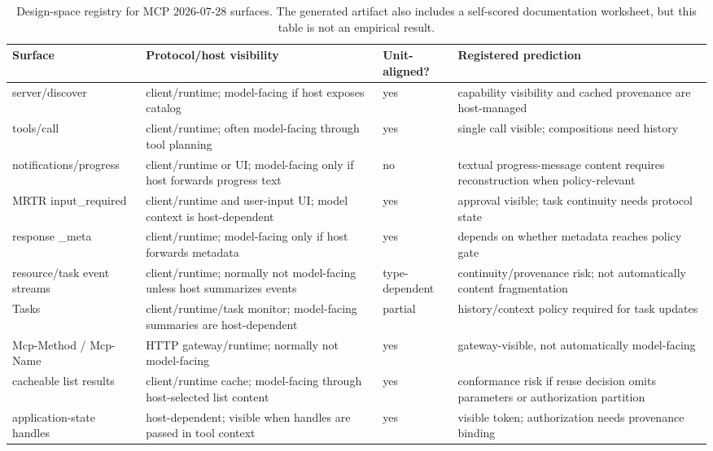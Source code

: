 \begin{table}[t]
  \caption{Design-space registry for MCP 2026-07-28 surfaces. The generated
  artifact also includes a self-scored documentation worksheet, but this table
  is not an empirical result.}
  \label{tab:predictions}
  \centering\footnotesize
  \begin{tabular}{@{}p{}p{}p{}p{}@{}}
    \toprule
    Surface & Protocol/host visibility & Unit-aligned? & Registered prediction \\
    \midrule
    server/discover & client/runtime; model-facing if host exposes catalog & yes & capability visibility and cached provenance are host-managed \\
    tools/call & client/runtime; often model-facing through tool planning & yes & single call visible; compositions need history \\
    notifications/progress & client/runtime or UI; model-facing only if host forwards progress text & no & textual progress-message content requires reconstruction when policy-relevant \\
    MRTR input\_required & client/runtime and user-input UI; model context is host-dependent & yes & approval visible; task continuity needs protocol state \\
    response \_meta & client/runtime; model-facing only if host forwards metadata & yes & depends on whether metadata reaches policy gate \\
    resource/task event streams & client/runtime; normally not model-facing unless host summarizes events & type-dependent & continuity/provenance risk; not automatically content fragmentation \\
    Tasks & client/runtime/task monitor; model-facing summaries are host-dependent & partial & history/context policy required for task updates \\
    Mcp-Method / Mcp-Name & HTTP gateway/runtime; normally not model-facing & yes & gateway-visible, not automatically model-facing \\
    cacheable list results & client/runtime cache; model-facing through host-selected list content & yes & conformance risk if reuse decision omits parameters or authorization partition \\
    application-state handles & host-dependent; visible when handles are passed in tool context & yes & visible token; authorization needs provenance binding \\
    \bottomrule
  \end{tabular}
\end{table}
